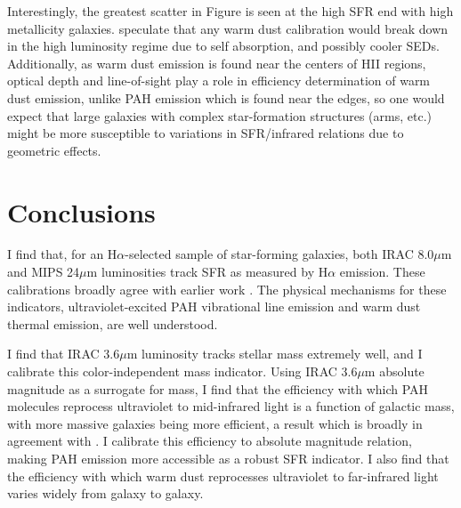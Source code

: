 
Interestingly, the greatest scatter in Figure  is seen at the high SFR end with high metallicity galaxies. \cite{Calzetti2010} speculate that any warm dust calibration would break down in the high luminosity regime due to self absorption, and possibly cooler SEDs. Additionally, as warm dust emission is found near the centers of HII regions, optical depth and line-of-sight play a role in efficiency determination of warm dust emission, unlike PAH emission which is found near the edges, so one would expect that large galaxies with complex star-formation structures (arms, etc.) might be more susceptible to variations in SFR/infrared relations due to geometric effects.




\section{\label{sec:level1} Conclusions}


I find that, for an H$\alpha$-selected sample of star-forming galaxies, both IRAC 8.0$\mu$m and MIPS 24$\mu$m luminosities track SFR as measured by H$\alpha$ emission. These calibrations broadly agree with earlier work \citep{Calzetti2007,Wu,AlonsoHerrero,PerezGonzalez,Relano}. The physical mechanisms for these indicators, ultraviolet-excited PAH vibrational line emission and warm dust thermal emission, are well understood.

I find that IRAC 3.6$\mu$m luminosity tracks stellar mass extremely well, and I calibrate this color-independent mass indicator. Using IRAC 3.6$\mu$m absolute magnitude as a surrogate for mass, I find that the efficiency with which PAH molecules reprocess ultraviolet to mid-infrared light is a function of galactic mass, with more massive galaxies being more efficient, a result which is broadly in agreement with \cite{Hong}. I calibrate this efficiency to absolute magnitude relation, making PAH emission more accessible as a robust SFR indicator. I also find that the efficiency with which warm dust reprocesses ultraviolet to far-infrared light varies widely from galaxy to galaxy.

